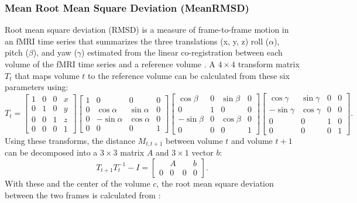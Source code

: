 \documentclass{frontiersSCNS} %
\begin{document}
\subsubsection*{Mean Root Mean Square Deviation (MeanRMSD)}
\label{sec:16}
Root mean square deviation (RMSD) is a measure of frame-to-frame motion in an fMRI time series that summarizes the three translations (x, y, z) roll ($\alpha$), pitch ($\beta$), and yaw ($\gamma$) estimated from the linear co-registration between each volume of the fMRI time series and a reference volume \citep{Jenkinson99FD}. A $4\times4$ transform matrix $T_t$ that maps volume $t$ to the reference volume can be calculated from these six parameters using:
\begin{equation}
    T_t = \begin{bmatrix}
          1 & 0 & 0 & x\\[-3mm]
          0 & 1 & 0 & y\\[-3mm]
          0 & 0 & 1 & z\\[-3mm]
          0 & 0 & 0 & 1
     \end{bmatrix}
     \begin{bmatrix}
          1 & 0 & 0 & 0\\[-3mm]
          0 & \cos\alpha & \sin\alpha & 0\\[-3mm]
          0 & -\sin\alpha & \cos\alpha & 0\\[-3mm]
          0 & 0 & 0 & 1
     \end{bmatrix}
     \begin{bmatrix}
          \cos\beta & 0 & \sin\beta & 0\\[-3mm]
          0 & 1 & 0 & 0 \\[-3mm]
          -\sin\beta & 0 & \cos\beta & 0\\[-3mm]
          0 & 0  & 0 & 1
     \end{bmatrix}
     \begin{bmatrix}
          \cos\gamma & \sin\gamma & 0 & 0\\[-3mm]
          -\sin\gamma & \cos\gamma & 0 & 0\\[-3mm]
          0 & 0 & 1 & 0\\[-3mm]
          0 & 0 & 0 & 1
     \end{bmatrix}.
\end{equation} Using these transforms, the distance $M_{t,t+1}$ between volume $t$ and volume $t+1$ can be decomposed into a $3\times3$ matrix $A$ and $3\times1$ vector $b$:
\begin{equation}
        T_{t+1}T_{t}^{-1}-I = \begin{bmatrix}
           & A & & b \\[-3mm]
          0 & 0 & 0 & 0
     \end{bmatrix}.
\end{equation} With these and the center of the volume  $c$, the root mean square deviation between the two frames is calculated from \citep[using the notation in][]{Yan2013}:
\end{document}
